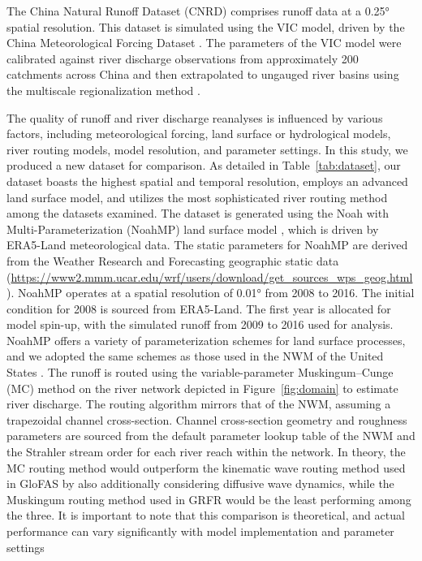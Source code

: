 \documentclass[water,article,submit,pdftex,moreauthors]{Definitions/mdpi}
\begin{document}
The China Natural Runoff Dataset (CNRD) \citep{gou2021BAMS, miao2022CSB} comprises runoff data at a 0.25° spatial resolution. This dataset is simulated using the VIC model, driven by the China Meteorological Forcing Dataset \citep{he2020SD}. The parameters of the VIC model were calibrated against river discharge observations from approximately 200 catchments across China and then extrapolated to ungauged river basins using the multiscale regionalization method \citep{samaniego2010WRR}.

The quality of runoff and river discharge reanalyses is influenced by various factors, including meteorological forcing, land surface or hydrological models, river routing models, model resolution, and parameter settings. In this study, we produced a new dataset for comparison. As detailed in Table~\ref{tab:dataset}, our dataset boasts the highest spatial and temporal resolution, employs an advanced land surface model, and utilizes the most sophisticated river routing method among the datasets examined. The dataset is generated using the Noah with Multi-Parameterization (NoahMP) land surface model \citep{niu2011JGRA}, which is driven by ERA5-Land meteorological data. The static parameters for NoahMP are derived from the Weather Research and Forecasting geographic static data (\url{https://www2.mmm.ucar.edu/wrf/users/download/get_sources_wps_geog.html}). NoahMP operates at a spatial resolution of 0.01° from 2008 to 2016. The initial condition for 2008 is sourced from ERA5-Land. The first year is allocated for model spin-up, with the simulated runoff from 2009 to 2016 used for analysis. NoahMP offers a variety of parameterization schemes for land surface processes, and we adopted the same schemes as those used in the NWM of the United States \citep{cosgrove2024JAWRA}. The runoff is routed using the variable-parameter Muskingum--Cunge (MC) method on the river network depicted in Figure~\ref{fig:domain} to estimate river discharge. The routing algorithm mirrors that of the NWM, assuming a trapezoidal channel cross-section. Channel cross-section geometry and roughness parameters are sourced from the default parameter lookup table of the NWM \citep{read2023JAWRA} and the Strahler stream order for each river reach within the network. In theory, the MC routing method would outperform the kinematic wave routing method used in GloFAS by also additionally considering diffusive wave dynamics, while the Muskingum routing method used in GRFR would be the least performing among the three. It is important to note that this comparison is theoretical, and actual performance can vary significantly with model implementation and parameter settings
\end{document}
